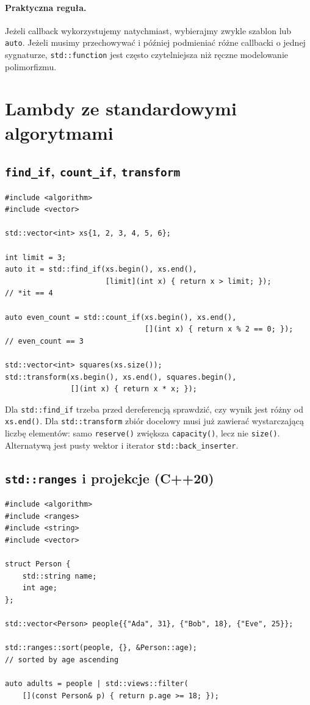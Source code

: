 \paragraph{Praktyczna reguła.}
Jeżeli callback wykorzystujemy natychmiast, wybierajmy zwykle szablon
lub \texttt{auto}. Jeżeli musimy przechowywać i później podmieniać różne
callbacki o jednej sygnaturze, \texttt{std::function} jest często
czytelniejsza niż ręczne modelowanie polimorfizmu.

\section{Lambdy ze standardowymi algorytmami}
\label{sec:lambda-algorithms}

\subsection{\texttt{find\_if}, \texttt{count\_if}, \texttt{transform}}

\begin{lstlisting}
#include <algorithm>
#include <vector>

std::vector<int> xs{1, 2, 3, 4, 5, 6};

int limit = 3;
auto it = std::find_if(xs.begin(), xs.end(),
                       [limit](int x) { return x > limit; });
// *it == 4

auto even_count = std::count_if(xs.begin(), xs.end(),
                                [](int x) { return x % 2 == 0; });
// even_count == 3

std::vector<int> squares(xs.size());
std::transform(xs.begin(), xs.end(), squares.begin(),
               [](int x) { return x * x; });
\end{lstlisting}

Dla \texttt{std::find\_if} trzeba przed dereferencją sprawdzić, czy
wynik jest różny od \texttt{xs.end()}. Dla \texttt{std::transform} zbiór
docelowy musi już zawierać wystarczającą liczbę elementów: samo
\texttt{reserve()} zwiększa \texttt{capacity()}, lecz nie \texttt{size()}.
Alternatywą jest pusty wektor i iterator \texttt{std::back\_inserter}.

\subsection{\texttt{std::ranges} i projekcje (C++20)}

\begin{lstlisting}
#include <algorithm>
#include <ranges>
#include <string>
#include <vector>

struct Person {
    std::string name;
    int age;
};

std::vector<Person> people{{"Ada", 31}, {"Bob", 18}, {"Eve", 25}};

std::ranges::sort(people, {}, &Person::age);
// sorted by age ascending

auto adults = people | std::views::filter(
    [](const Person& p) { return p.age >= 18; });
\end{lstlisting}

